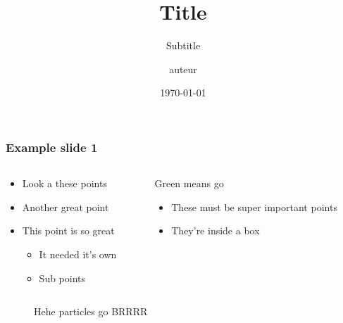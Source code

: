 \documentclass[11pt, aspectratio=169]{beamer}
\title{Title}
\subtitle{Subtitle}
\author{auteur}
\institute{Plateforme Imagerie, Robotique et Innovation en Santé}
\date{\today}
\begin{document}

\frame{\titlepage}

\begin{frame}
    \frametitle{Example slide 1}

    \begin{columns}
        \begin{column}{0.5\textwidth}

            \begin{itemize}
                \item Look a these points
                \item Another great point
                \item This point is so great
                      \begin{itemize}
                          \item It needed it's own
                          \item Sub points
                      \end{itemize}
            \end{itemize}
        \end{column}
        \begin{column}{0.5\textwidth}

            \begin{block}{Green means go}
                \begin{itemize}
                    \item
                          These must be super important points
                    \item
                          They're inside a box
                \end{itemize}
            \end{block}

        \end{column}
    \end{columns}

    \vfill
    \begin{figure}
        \centering
        {\def\svgwidth{0.7\textwidth}\footnotesize}
        \caption{Hehe particles go BRRRR}
        \label{fig:my_label}
    \end{figure}
\end{frame}
\end{document}
